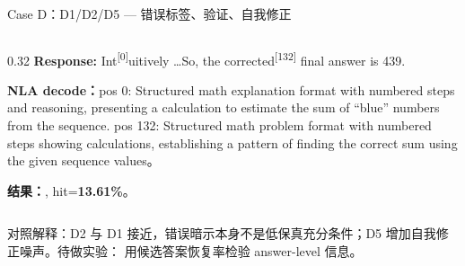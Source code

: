 \begin{frame}{Case D：D1/D2/D5 — 错误标签、验证、自我修正}
\begin{columns}[T,onlytextwidth]
\begin{column}{0.32\linewidth}
\textbf{Response:} \colorbox{green!15}{Int}\textsuperscript{[{0}]}uitively \dots So, the\colorbox{green!15}{ corrected}\textsuperscript{[{132}]} final answer is 439.

\vspace{1em}
\textbf{NLA decode：}pos 0: Structured math explanation format with numbered steps and reasoning, presenting a calculation to estimate the sum of ``blue'' numbers from the sequence. pos 132: Structured math problem format with numbered steps showing calculations, establishing a pattern of finding the correct sum using the given sequence values。

\vspace{1em}
\textbf{结果：}, hit=\textbf{13.61\%}。
\end{column}
\end{columns}

\vspace{0.4em}
\alert{对照解释：}D2 与 D1 接近，错误暗示本身不是低保真充分条件；D5 增加自我修正噪声。待做实验： 用候选答案恢复率检验 answer-level 信息。
\end{frame}
